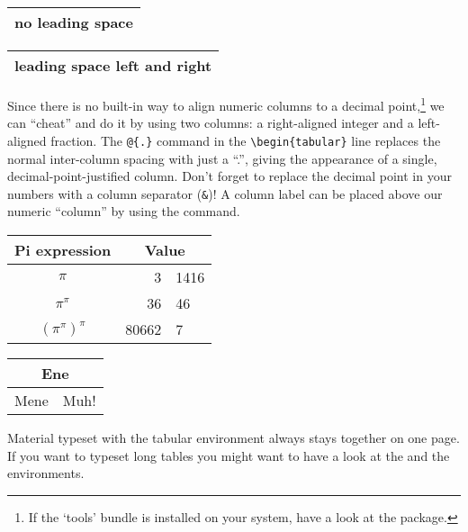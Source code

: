 \begin{example}
\begin{tabular}{@{} l @{}}
\hline 
no leading space\\
\hline
\end{tabular}
\end{example}

\begin{example}
\begin{tabular}{l}
\hline
leading space left and right\\
\hline
\end{tabular}
\end{example}

%
%

 Since there is no built-in way to align
numeric columns to a decimal point,\footnote{If the `tools' bundle is
  installed on your system, have a look at the  package.}
we can ``cheat'' and do it by using two columns: a right-aligned
integer and a left-aligned fraction. The \verb|@{.}| command in the
\verb|\begin{tabular}| line replaces the normal inter-column spacing with
just a ``.'', giving the appearance of a single,
decimal-point-justified column.  Don't forget to replace the decimal
point in your numbers with a column separator (\verb|&|)! A column label
can be placed above our numeric ``column'' by using the
 command.
 
\begin{example}
\begin{tabular}{c r @{.} l}
Pi expression       &
\multicolumn{2}{c}{Value} \\
\hline
$\pi$               & 3&1416  \\
$\pi^{\pi}$         & 36&46   \\
$(\pi^{\pi})^{\pi}$ & 80662&7 \\
\end{tabular}
\end{example}

\begin{example}
\begin{tabular}{|c|c|}
\hline
\multicolumn{2}{|c|}{Ene} \\
\hline
Mene & Muh! \\
\hline
\end{tabular}
\end{example}

Material typeset with the tabular environment always stays together on
one page. If you want to typeset long tables you might want to have a
look at the  and the  environments.

